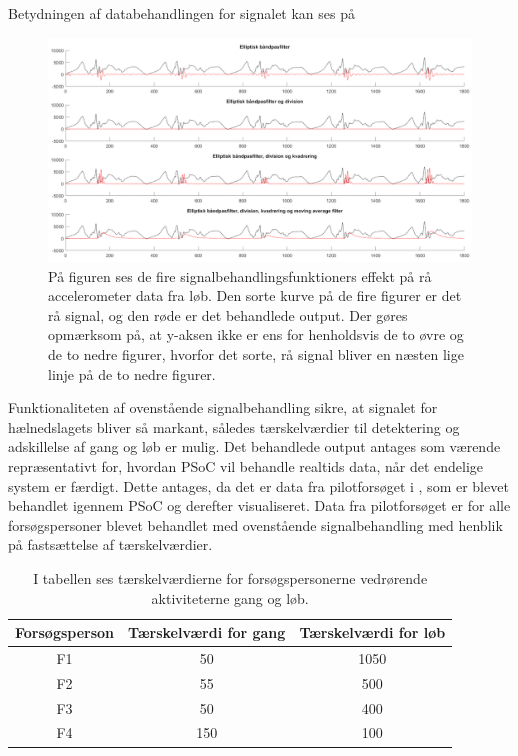 Betydningen af databehandlingen for signalet kan ses på 
\begin{figure}[H]
	\centering
	\includegraphics[width=1\textwidth]{figures/cDesign/signalbehandling_psoc.png}
	\caption{På figuren ses de fire signalbehandlingsfunktioners effekt på rå accelerometer data fra løb. Den sorte kurve på de fire figurer er det rå signal, og den røde er det behandlede output. Der gøres opmærksom på, at y-aksen ikke er ens for henholdsvis de to øvre og de to nedre figurer, hvorfor det sorte, rå signal bliver en næsten lige linje på de to nedre figurer.}
	\label{fig:algoritme_cykling2}
\end{figure}
Funktionaliteten af ovenstående signalbehandling sikre, at signalet for hælnedslagets bliver så markant, således tærskelværdier til detektering og adskillelse af gang og løb er mulig. Det behandlede output antages som værende repræsentativt for, hvordan PSoC vil behandle realtids data, når det endelige system er færdigt. Dette antages, da det er data fra pilotforsøget i , som er blevet behandlet igennem PSoC og derefter visualiseret. Data fra pilotforsøget er for alle forsøgspersoner blevet behandlet med ovenstående signalbehandling med henblik på fastsættelse af tærskelværdier. 
\begin{table}[H]
	\centering
	\begin{tabular}{ccc}
		\hline
		\rowcolor[HTML]{C0C0C0} 
		Forsøgsperson & Tærskelværdi for gang & Tærskelværdi for løb \\ \hline
		\rowcolor[HTML]{FFFFFF} 
		F1 & 50 & 1050 \\ \hline
		\rowcolor[HTML]{FFFFFF} 
		F2 & 55 & 500 \\ \hline
		\rowcolor[HTML]{FFFFFF} 
		F3 & 50 & 400 \\ \hline
		\rowcolor[HTML]{FFFFFF} 
		F4 & 150 & 100 \\ \hline
	\end{tabular}
	\caption{I tabellen ses tærskelværdierne for forsøgspersonerne vedrørende aktiviteterne gang og løb.}
	\label{tab:individuel_taerskel}
\end{table}\vspace{-0.5cm}
